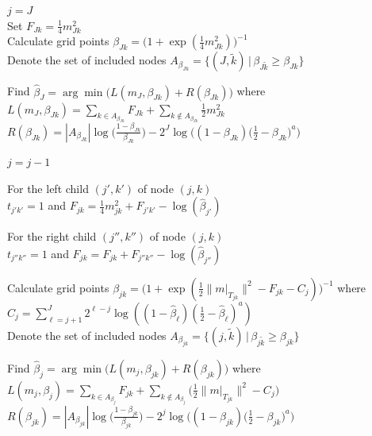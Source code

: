 \documentclass[11pt,a4paper]{article}
\newcommand{\g}{{\, |\,}}
\begin{document}
\begin{algorithm}[ht!]
\caption{Pseudo-code for automatic $\beta$ selection with Gaussian base prior}
\label{alg:beta}
$j=J$\\
  {Set $F_{Jk}=\frac{1}{4}m^2_{Jk}$\\
    Calculate grid points $\beta_{Jk} = \big(1+\exp(\frac{1}{4}m^2_{Jk})\big)^{-1}$
    \\
    Denote the set of included nodes $A_{\beta_{Jk}}=\{(J,\tilde{k}) \g \beta_{J\tilde{k}}\geq\beta_{Jk}\}$
    }
    
Find $\hat{\beta}_{J} =\arg\min \big(L(m_J,\beta_{Jk})+R(\beta_{Jk})\big)$ where\\
$L(m_J,\beta_{Jk})=\sum_{k\in A_{\beta_{Jk}}}F_{Jk}+\sum_{k\notin A_{\beta_{Jk}}}\frac{1}{2}m^2_{Jk}$ \\
$R(\beta_{Jk})=|A_{\beta_{Jk}}|\log\Big(\frac{1-\beta_{Jk}}{\beta_{Jk}}\Big)
-2^J\log\bigg((1-\beta_{Jk})\Big(\frac{1}{2}-\beta_{Jk}\Big)^a\bigg)$
\vspace{4mm}

$j = j-1$\\
    {
    {For the left child $(j',k')$ of node $(j,k)$\\
   {$t_{j'k'}=1$ and 
   $F_{jk}=\frac{1}{4}m_{jk}^2+F_{j'k'}-\log(\hat{\beta}_{j'})$}
   
For the right child $(j'',k'')$ of node $(j,k)$\\
   {$t_{j''k''}=1$ and 
   $F_{jk}=F_{jk}+F_{j''k''}-\log(\hat{\beta}_{j''})$}
   
   Calculate grid points $\beta_{jk} = \big(1+\exp(\frac{1}{2}\|m|_{T_{jk}}\|^2-F_{jk}-C_j)\big)^{-1}$ where\\ 
   $C_j=\sum_{\ell=j+1}^J 2^{\ell-j} \log((1-\hat{\beta}_\ell)(\frac{1}{2}-\hat{\beta}_\ell)^a)$\\
   Denote the set of included nodes 
   $A_{\beta_{jk}}=\{(j,\tilde{k}) \g \beta_{j\tilde{k}}\geq\beta_{jk}\}$
   }
   Find $\hat{\beta}_{j} =\arg\min \big(L(m_j,\beta_{jk})+R(\beta_{jk})\big)$ where\\
    $L(m_j,\beta_j)= \sum_{k\in A_{\beta_j}}F_{jk} 
    + \sum_{k\notin A_{\beta_j}}\Big(\frac{1}{2}\|m|_{T_{jk}}\|^2-C_j\Big)$ \;
    $R(\beta_{jk})=|A_{\beta_{jk}}|\log\Big(\frac{1-\beta_{jk}}{\beta_{jk}}\Big)
    -2^j\log\bigg((1-\beta_{jk})\Big(\frac{1}{2}-\beta_{jk}\Big)^a\bigg)$
    } 


\end{algorithm}
\end{document}
